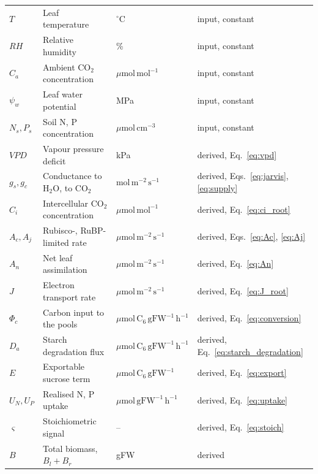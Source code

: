\begin{table}[!htbp]
\begin{tabular}{@{}lllp{34mm}@{}}
$T$          & Leaf temperature                   & $^\circ$C                     & input, constant \\
$\mathit{RH}$& Relative humidity                  & \%                            & input, constant \\
$C_a$        & Ambient CO$_2$ concentration       & $\mu\mathrm{mol\,mol^{-1}}$   & input, constant \\
$\psi_w$     & Leaf water potential               & MPa                           & input, constant \\
$N_s,P_s$    & Soil N, P concentration            & $\mu\mathrm{mol\,cm^{-3}}$    & input, constant \\
\midrule
$\mathit{VPD}$ & Vapour pressure deficit          & kPa                           & derived, Eq.~\eqref{eq:vpd} \\
$g_s,g_c$    & Conductance to H$_2$O, to CO$_2$   & $\mathrm{mol\,m^{-2}\,s^{-1}}$& derived, Eqs.~\eqref{eq:jarvis}, \eqref{eq:supply} \\
$C_i$        & Intercellular CO$_2$ concentration & $\mu\mathrm{mol\,mol^{-1}}$   & derived, Eq.~\eqref{eq:ci_root} \\
$A_c,A_j$    & Rubisco-, RuBP-limited rate        & $\mu\mathrm{mol\,m^{-2}\,s^{-1}}$ & derived, Eqs.~\eqref{eq:Ac}, \eqref{eq:Aj} \\
$A_n$        & Net leaf assimilation              & $\mu\mathrm{mol\,m^{-2}\,s^{-1}}$ & derived, Eq.~\eqref{eq:An} \\
$J$          & Electron transport rate            & $\mu\mathrm{mol\,m^{-2}\,s^{-1}}$ & derived, Eq.~\eqref{eq:J_root} \\
$\Phi_c$     & Carbon input to the pools          & $\mu\mathrm{mol\,C_6\,gFW^{-1}\,h^{-1}}$ & derived, Eq.~\eqref{eq:conversion} \\
$D_a$        & Starch degradation flux            & $\mu\mathrm{mol\,C_6\,gFW^{-1}\,h^{-1}}$ & derived, Eq.~\eqref{eq:starch_degradation} \\
$E$          & Exportable sucrose term            & $\mu\mathrm{mol\,C_6\,gFW^{-1}}$ & derived, Eq.~\eqref{eq:export} \\
$U_N,U_P$    & Realised N, P uptake               & $\mu\mathrm{mol\,gFW^{-1}\,h^{-1}}$ & derived, Eq.~\eqref{eq:uptake} \\
$\varsigma$  & Stoichiometric signal              & --                            & derived, Eq.~\eqref{eq:stoich} \\
$B$          & Total biomass, $B_l+B_r$           & gFW                           & derived \\
\bottomrule
\end{tabular}
\end{table}

